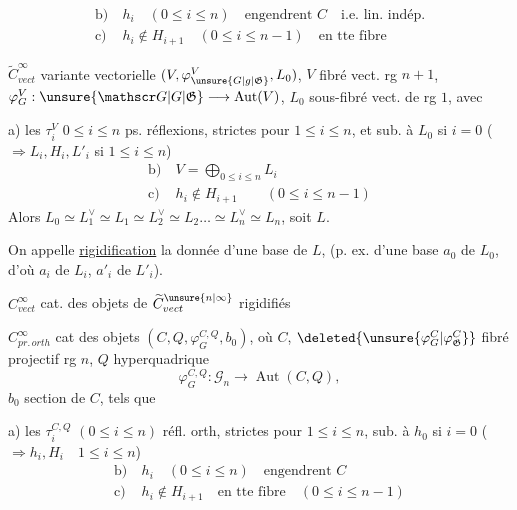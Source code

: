 \[
\begin{aligned}
\text{b)}\ & h_i\quad(0\leq i\leq n)\quad \text{engendrent } C\quad\text{i.e. lin. indép.}\\
\text{c)}\ & h_i\notin H_{i+1}\quad(0\leq i\leq n-1)\quad\text{en tte fibre}
\end{aligned}
\]

$\widetilde C^\infty_{vect}$ variante vectorielle $(V,\varphi_{\unsure{G|g|\mathfrak G}}^V,L_0)$, $V$ fibré vect. rg $n+1$, $\varphi_G^V:\unsure{\mathscr G|G|\mathfrak G}\longrightarrow\operatorname{Aut}(V)$, $L_0$ sous-fibré vect. de rg $1$, avec

a) les $\tau_i^V$ $0\leq i\leq n$ ps. réflexions, strictes pour $1\leq i\leq n$, et sub. à $L_0$ si $i=0$ ($\Rightarrow L_i,H_i,L'_i$ si $1\leq i\leq n$)
\[
\begin{aligned}
\text{b)}\ & V=\bigoplus_{0\leq i\leq n} L_i\\
\text{c)}\ & h_i\notin H_{i+1}\qquad(0\leq i\leq n-1)
\end{aligned}
\]
Alors $L_0\simeq L_1^\vee\simeq L_1\simeq L_2^\vee\simeq L_2\ldots\simeq L_n^\vee\simeq L_n$, soit $L$.

On appelle \uline{rigidification} la donnée d'une base de $L$, (p. ex. d'une base $a_0$ de $L_0$, d'où $a_i$ de $L_i$, $a'_i$ de $L'_i$).

$C^\infty_{vect}$ cat. des objets de $\widetilde C^{\unsure{n|\infty}}_{vect}$ rigidifiés

$C^\infty_{pr.\,orth}$ cat des objets $(C,Q,\varphi_G^{C,Q},b_0)$, où $C$, $\deleted{\unsure{\varphi_G^C|\varphi_{\mathfrak G}^C}}$ fibré projectif rg $n$, $Q$ hyper\inserted{$\unsure{\infty}$}quadrique 
\[
\varphi_G^{C,Q}:\mathscr G_n\longrightarrow\operatorname{Aut}(C,Q),
\]
$b_0$ section de $C$, tels que

a) les $\tau_i^{C,Q}$ $(0\leq i\leq n)$ réfl. orth, strictes pour $1\leq i\leq n$, sub. à $h_0$ si $i=0$ ($\Rightarrow h_i,H_i\quad1\leq i\leq n$)
\[
\begin{aligned}
\text{b)}\ &h_i\quad (0\leq i\leq n)\quad\text{engendrent }C\\
\text{c)}\ &h_i\notin H_{i+1}\quad\text{en tte fibre}\quad(0\leq i\leq n-1)
\end{aligned}
\]

